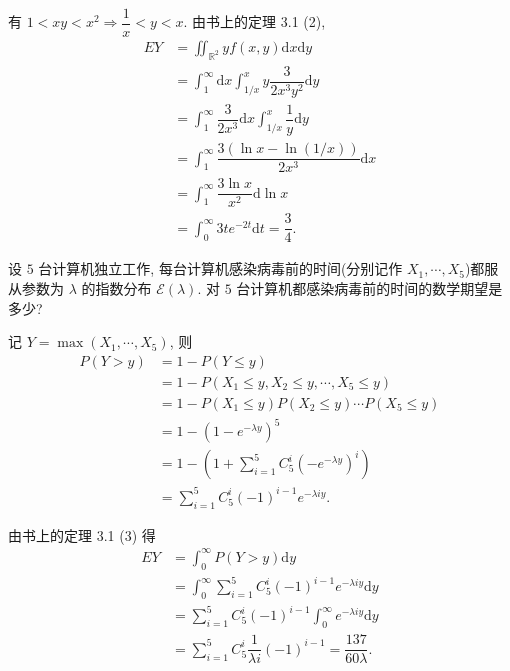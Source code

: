 \documentclass[color=black,device=normal,lang=cn]{elegantnote}
\numberwithin{equation}{section}
\theoremstyle{plain}
\numberwithin{exercise}{exsection}
\begin{document}
\begin{solution}
    有 $1<xy<x^2\Rightarrow\dfrac{1}{x}<y<x$. 由书上的定理 3.1 (2),
    \begin{align*}
        EY & =\iint_{\mathbb{R}^2}yf(x,y)\mathrm{d}x\mathrm{d}y \\
        & =\int_1^\infty\mathrm{d}x\int_{1/x}^xy\dfrac{3}{2x^3y^2}\mathrm{d}y \\
        & =\int_1^\infty\dfrac{3}{2x^3}\mathrm{d}x\int_{1/x}^x\dfrac{1}{y}\mathrm{d}y \\
        & =\int_1^\infty\dfrac{3(\ln x-\ln (1/x))}{2x^3}\mathrm{d}x \\
        & =\int_1^\infty\dfrac{3\ln x}{x^2}\mathrm{d}\ln x \\
        & =\int_0^\infty3te^{-2t}\mathrm{d}t=\dfrac{3}{4}.
    \end{align*}
\end{solution}
\addtocounter{exercise}{2}
\begin{exercise}[b]%
    设 $5$ 台计算机独立工作, 每台计算机感染病毒前的时间(分别记作 $X_1,\cdots,X_5$)都服从参数为 $\lambda$ 的指数分布 $\mathcal{E}(\lambda)$. 对 $5$ 台计算机都感染病毒前的时间的数学期望是多少?
\end{exercise}
\begin{solution}
    记 $Y=\max(X_1,\cdots,X_5)$, 则
    \begin{align*}
        P(Y>y) & =1-P(Y\leq y) \\
        & =1-P(X_1\leq y,X_2\leq y,\cdots,X_5\leq y) \\
        & =1-P(X_1\leq y)P(X_2\leq y)\cdots P(X_5\leq y) \\
        & =1-(1-e^{-\lambda y})^5 \\
        & =1-\left(1+\sum\limits_{i=1}^5C_5^i(-e^{-\lambda y})^i\right) \\
        & =\sum\limits_{i=1}^5C_5^i(-1)^{i-1}e^{-\lambda iy}.
    \end{align*}

    由书上的定理 3.1 (3) 得
    \begin{align*}
        EY & =\int_0^\infty P(Y>y)\mathrm{d}y \\
        & =\int_0^\infty\sum\limits_{i=1}^5C_5^i(-1)^{i-1}e^{-\lambda iy}\mathrm{d}y \\
        & =\sum\limits_{i=1}^5C_5^i(-1)^{i-1}\int_0^\infty e^{-\lambda iy}\mathrm{d}y \\
        & =\sum\limits_{i=1}^5C_5^i\dfrac{1}{\lambda i}(-1)^{i-1}=\dfrac{137}{60\lambda}.
    \end{align*}
\end{solution}
\end{document}
